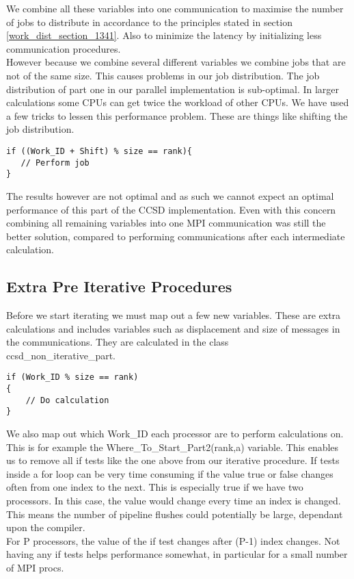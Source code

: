 \documentclass[a4paper,norsk,11pt,twoside]{report}
\begin{document}
We combine all these variables into one communication to maximise the number of jobs to distribute in accordance to the principles stated in section \ref{work_dist_section_1341}. Also to minimize the latency by initializing less communication procedures. \\

However because we combine several different variables we combine jobs that are not of the same size. This causes problems in our job distribution. The job distribution of part one in our parallel implementation is sub-optimal. In larger calculations some CPUs can get twice the workload of other CPUs. We have used a few tricks to lessen this performance problem. These are things like shifting the job distribution.

\begin{lstlisting}
if ((Work_ID + Shift) % size == rank){
   // Perform job
}
\end{lstlisting}

The results however are not optimal and as such we cannot expect an optimal performance of this part of the CCSD implementation. Even with this concern combining all remaining variables into one MPI communication was still the better solution, compared to performing communications after each intermediate calculation.   

\subsection{Extra Pre Iterative Procedures}
Before we start iterating we must map out a few new variables. These are extra calculations and includes variables such as displacement and size of messages in the communications. They are calculated in the class \\ ccsd\_non\_iterative\_part. \\

\begin{lstlisting}
if (Work_ID % size == rank)
{
    // Do calculation
}
\end{lstlisting}

We also map out which Work\_ID each processor are to perform calculations on. This is for example the Where\_To\_Start\_Part2(rank,a) variable. This enables us to remove all if tests like the one above from our iterative procedure. If tests inside a for loop can be very time consuming if the value true or false changes often from one index to the next. This is especially true if we have two processors. In this case, the value would change every time an index is changed. This means the number of pipeline flushes could potentially be large, dependant upon the compiler. \\

For P processors, the value of the if test changes after (P-1) index changes. Not having any if tests helps performance somewhat, in particular for a small number of MPI procs.
\end{document}
